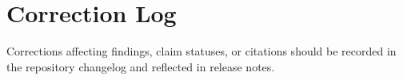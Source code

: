 \chapter{Correction Log}


Corrections affecting findings, claim statuses, or citations should be recorded in the repository changelog and reflected in release notes.

